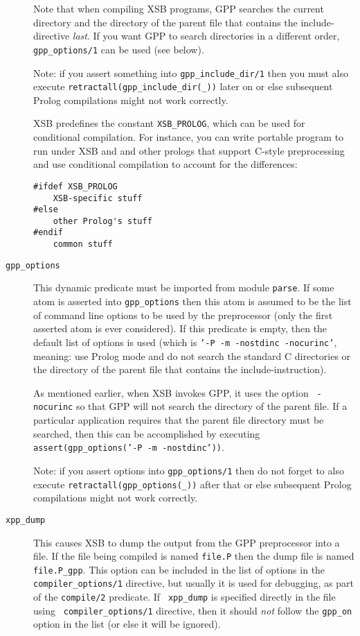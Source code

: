 \begin{description}
  Note that when compiling XSB programs, GPP searches the current
  directory and the directory of the parent file that contains the
  include-directive \emph{last}. 
  If you want GPP to search directories in a different order, {\tt
    gpp\_options/1} can be used (see below).

  Note: if you assert something into \texttt{gpp\_include\_dir/1} then you
  must also execute {\tt retractall(gpp\_include\_dir(\_))} later on or
  else subsequent Prolog compilations might not work correctly.

  XSB predefines the constant {\tt XSB\_PROLOG}, which can be used for
  conditional compilation. For instance, you can write portable program
  to run under XSB and and other prologs that support C-style
  preprocessing and use conditional compilation to account for the
  differences: 
  \begin{samepage}
  \begin{verbatim}
#ifdef XSB_PROLOG
    XSB-specific stuff
#else
    other Prolog's stuff
#endif
    common stuff
  \end{verbatim}
  \end{samepage}

\item[{\tt gpp\_options}]  This
  dynamic predicate must be imported from module {\tt parse}.  If some
  atom is asserted into {\tt gpp\_options} then this atom is assumed
  to be the list of command line options to be used by the
  preprocessor (only the first asserted atom is ever considered). If
  this predicate is empty, then the default list of options is used
  (which is {\tt '-P -m -nostdinc -nocurinc'}, meaning: use Prolog
  mode and do not search the standard C directories or the directory
  of the parent file that contains the include-instruction).
  
  As mentioned earlier, when XSB invokes GPP, it uses the option {\tt
    -nocurinc} so that GPP will not search the directory of the parent
  file.  If a particular application requires that the parent file
  directory must be searched, then this can be accomplished by
  executing {\tt assert(gpp\_options('-P -m -nostdinc'))}.
  
  Note: if you assert options into \texttt{gpp\_options/1} then do not
  forget to
  also execute \texttt{retractall(gpp\_options(\_))} after that or else
  subsequent Prolog compilations might not work correctly.
  
\item[{\tt xpp\_dump}] 
  This causes XSB to dump the output from the GPP preprocessor into a file.
  If the file being compiled is named {\tt file.P} then the dump file is
  named {\tt file.P\_gpp}. This option can be included in the list of
  options in the {\tt compiler\_options/1} directive, but usually it is
  used for debugging, as part of the {\tt compile/2} predicate. If {\tt
    xpp\_dump} is specified directly in the file using {\tt
    compiler\_options/1} directive, then it should \emph{not} follow the
  {\tt gpp\_on} option in the list (or else it will be ignored).


\end{description}

